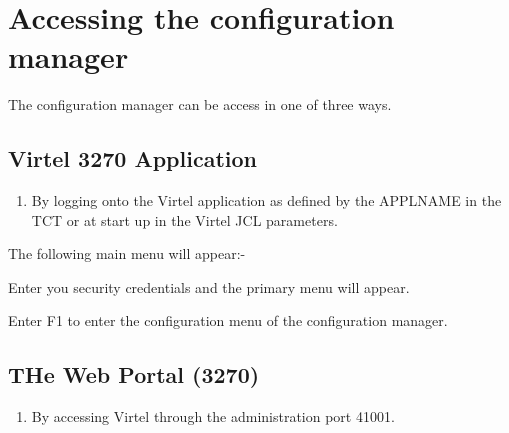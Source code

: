 \documentclass[letterpaper,10pt,english]{sphinxmanual}
\begin{document}
\section{Accessing the configuration manager}
\label{\detokenize{connectivity_guide:accessing-the-configuration-manager}}
The configuration manager can be access in one of three ways.


\subsection{Virtel 3270 Application}
\label{\detokenize{connectivity_guide:virtel-3270-application}}\begin{enumerate}
\def\theenumi{\arabic{enumi}}
\def\labelenumi{\theenumi .}
\makeatletter\def\p@enumii{\p@enumi \theenumi .}\makeatother
\item {} 
By logging onto the Virtel application as defined by the APPLNAME in the TCT or at start up in the Virtel JCL parameters.

\end{enumerate}

\begin{sphinxVerbatim}[commandchars=\\\{\}]
 
\end{sphinxVerbatim}

The following main menu will appear:-


Enter you security credentials and the primary menu will appear.


Enter F1 to enter the configuration menu of the configuration manager.


\newpage


\subsection{THe Web Portal (3270)}
\label{\detokenize{connectivity_guide:the-web-portal-3270}}\begin{enumerate}
\def\theenumi{\arabic{enumi}}
\def\labelenumi{\theenumi .}
\makeatletter\def\p@enumii{\p@enumi \theenumi .}\makeatother
\setcounter{enumi}{1}
\item {} 
By accessing Virtel through the administration port 41001.

\end{enumerate}
\end{document}
